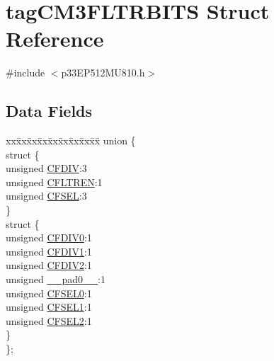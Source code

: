 \hypertarget{structtag_c_m3_f_l_t_r_b_i_t_s}{}\section{tag\+C\+M3\+F\+L\+T\+R\+B\+I\+TS Struct Reference}
\label{structtag_c_m3_f_l_t_r_b_i_t_s}


{\ttfamily \#include $<$p33\+E\+P512\+M\+U810.\+h$>$}

\subsection*{Data Fields}
\begin{DoxyCompactItemize}
\item 
\begin{tabbing}
xx\=xx\=xx\=xx\=xx\=xx\=xx\=xx\=xx\=\kill
union \{\\
\>struct \{\\
\>\>unsigned \hyperlink{structtag_c_m3_f_l_t_r_b_i_t_s_a893ad85a5c5ff41a31026a67aabcb96d}{CFDIV}:3\\
\>\>unsigned \hyperlink{structtag_c_m3_f_l_t_r_b_i_t_s_a85ad433261457df9a932a90af5069ab8}{CFLTREN}:1\\
\>\>unsigned \hyperlink{structtag_c_m3_f_l_t_r_b_i_t_s_a99780df15940d1bf27ba93d175f5f80b}{CFSEL}:3\\
\>\} \\
\>struct \{\\
\>\>unsigned \hyperlink{structtag_c_m3_f_l_t_r_b_i_t_s_a801d936cb077eadf1231d520cd686dec}{CFDIV0}:1\\
\>\>unsigned \hyperlink{structtag_c_m3_f_l_t_r_b_i_t_s_a53ee480be3ec69aea8d88e45a1fde39a}{CFDIV1}:1\\
\>\>unsigned \hyperlink{structtag_c_m3_f_l_t_r_b_i_t_s_abd46218cfab17e4af53137815971f148}{CFDIV2}:1\\
\>\>unsigned \hyperlink{structtag_c_m3_f_l_t_r_b_i_t_s_adf71f3d8410c1f1dbbc96680a92c49af}{\_\_pad0\_\_}:1\\
\>\>unsigned \hyperlink{structtag_c_m3_f_l_t_r_b_i_t_s_a20d8c88694244bc63a0138ecea229c33}{CFSEL0}:1\\
\>\>unsigned \hyperlink{structtag_c_m3_f_l_t_r_b_i_t_s_ab3beae446242496efe6f3b65b42f32f4}{CFSEL1}:1\\
\>\>unsigned \hyperlink{structtag_c_m3_f_l_t_r_b_i_t_s_a136e38e2a181ec59b7952e0a8e019fc4}{CFSEL2}:1\\
\>\} \\
\}; \\

\end{tabbing}\end{DoxyCompactItemize}


